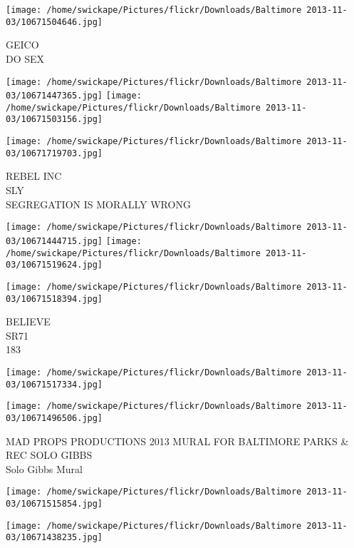 \documentclass[10pt,letterpaper]{article}
\begin{document}
\vspace{0.25in}
\texttt{[image: /home/swickape/Pictures/flickr/Downloads/Baltimore 2013-11-03/10671504646.jpg]}

GEICO\\
DO SEX\\
\pagebreak

\texttt{[image: /home/swickape/Pictures/flickr/Downloads/Baltimore 2013-11-03/10671447365.jpg]}
\texttt{[image: /home/swickape/Pictures/flickr/Downloads/Baltimore 2013-11-03/10671503156.jpg]}

\vspace{0.25in}
\texttt{[image: /home/swickape/Pictures/flickr/Downloads/Baltimore 2013-11-03/10671719703.jpg]}

REBEL INC\\
SLY\\
SEGREGATION IS MORALLY WRONG\\
\pagebreak

\texttt{[image: /home/swickape/Pictures/flickr/Downloads/Baltimore 2013-11-03/10671444715.jpg]}
\texttt{[image: /home/swickape/Pictures/flickr/Downloads/Baltimore 2013-11-03/10671519624.jpg]}

\texttt{[image: /home/swickape/Pictures/flickr/Downloads/Baltimore 2013-11-03/10671518394.jpg]}

BELIEVE\\
SR71\\
183\\
\pagebreak

\texttt{[image: /home/swickape/Pictures/flickr/Downloads/Baltimore 2013-11-03/10671517334.jpg]}

\vspace{0.25in}
\texttt{[image: /home/swickape/Pictures/flickr/Downloads/Baltimore 2013-11-03/10671496506.jpg]}

MAD PROPS PRODUCTIONS 2013 MURAL FOR BALTIMORE PARKS \& REC SOLO GIBBS\\
Solo Gibbs Mural\\
\pagebreak

\texttt{[image: /home/swickape/Pictures/flickr/Downloads/Baltimore 2013-11-03/10671515854.jpg]}

\vspace{0.25in}
\texttt{[image: /home/swickape/Pictures/flickr/Downloads/Baltimore 2013-11-03/10671438235.jpg]}
\end{document}
